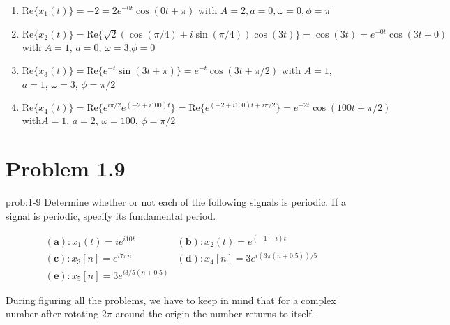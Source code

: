 \documentclass[koma,a4paper,utopia,12pt,listings-color,microtype,paralist,colorlinks,urlcolor=red]{org-article}
\begin{document}
\begin{enumerate}
\item \(\mathrm{Re}\{x_{1}(t)\} = -2 = 2e^{-0t}\cos(0t + \pi)\) with \(A = 2,
   a=0, \omega = 0, \phi = \pi\)
\item \(\mathrm{Re} \{x_{2}(t)\} = \mathrm{Re} \{ \sqrt{2} ( \cos( \pi/4 ) + i
   \sin (\pi/4) ) \cos(3t) \} = \cos(3t) = e^{-0t}\cos( 3t + 0 )\) with \(A =
   1\), \(a = 0\), \(\omega = 3\),\(\phi = 0\)
\item \(\mathrm{Re} \{ x_{3}(t) \} = \mathrm{Re} \{ e^{-t} \sin ( 3t + \pi )  \}
   = e^{-t}\cos(3t + \pi/2)\) with \(A=1\), \(a=1\), \(\omega=3\), \(\phi=\pi/2\)
\item \(\mathrm{Re} \{x_{4}(t)\}   = \mathrm{Re} \{
   e^{i\pi/2} e^{(-2+i100)t} \} = \mathrm{Re}\{ e^{(-2 + i100)t + i\pi/2} \} =
   e^{-2t}\cos(100t + \pi/2)\) with\(A = 1\), \(a=2\), \(\omega=100\), \(\phi=\pi/2\)
\end{enumerate}

\section{Problem 1.9}
\label{sec:orgea8c035}



\begin{prob}[]{prob:1-9}
Determine whether or not each of the following signals is periodic. If a signal
is periodic, specify its fundamental period.

\begin{equation*}
\begin{array}{ll}
\mathbf{( a )}: x_{1}(t) = ie^{i10t} &  \mathbf{( b )}: x_{2}(t) = e^{(-1 + i)t} \\
\mathbf{( c )}: x_{3}[n] = e^{i7\pi n} & \mathbf{( d )}: x_{4}[n] = 3e^{i( 3\pi ( n + 0.5 ) ) / 5} \\
\mathbf{( e )}: x_{5}[n] = 3e^{ i3/5(n+ 0.5 )} & \
\end{array}
\end{equation*}
\label{prob:1-9}
\end{prob}



During figuring all the problems, we have to keep in mind that for a complex
number after rotating \(2\pi\) around the origin the number returns to itself.
\end{document}
